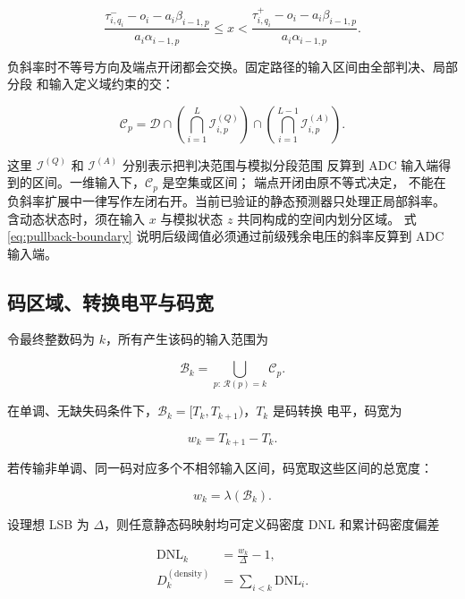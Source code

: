 \documentclass[11pt,a4paper]{ctexart}
\theoremstyle{adcplain}
\theoremstyle{definition}
\begin{document}
\begin{equation}
  \frac{\tau^-_{i,q_i}-o_i-a_i\beta_{i-1,p}}
       {a_i\alpha_{i-1,p}}
  \le x
  <
  \frac{\tau^+_{i,q_i}-o_i-a_i\beta_{i-1,p}}
       {a_i\alpha_{i-1,p}}.
  \label{eq:pullback-boundary}
\end{equation}

负斜率时不等号方向及端点开闭都会交换。固定路径的输入区间由全部判决、局部分段
和输入定义域约束的交：

\begin{equation}
  \mathcal C_p
  =
  \mathcal D
  \cap
  \left(\bigcap_{i=1}^{L}\mathcal I^{(Q)}_{i,p}\right)
  \cap
  \left(\bigcap_{i=1}^{L-1}\mathcal I^{(A)}_{i,p}\right).
  \label{eq:cell-intersection}
\end{equation}

这里 $\mathcal I^{(Q)}$ 和 $\mathcal I^{(A)}$ 分别表示把判决范围与模拟分段范围
反算到 ADC 输入端得到的区间。一维输入下，$\mathcal C_p$ 是空集或区间；
端点开闭由原不等式决定，
不能在负斜率扩展中一律写作左闭右开。当前已验证的静态预测器只处理正局部斜率。
含动态状态时，须在输入 $x$ 与模拟状态 $z$ 共同构成的空间内划分区域。
式 \eqref{eq:pullback-boundary} 说明后级阈值必须通过前级残余电压的斜率反算到
ADC 输入端。

\subsection{码区域、转换电平与码宽}

令最终整数码为 $k$，所有产生该码的输入范围为

\begin{equation}
  \mathcal B_k
  =
  \bigcup_{p:\,\mathcal R(p)=k}\mathcal C_p.
  \label{eq:code-preimage}
\end{equation}

在单调、无缺失码条件下，$\mathcal B_k=[T_k,T_{k+1})$，$T_k$ 是码转换
电平，码宽为

\begin{equation}
  w_k=T_{k+1}-T_k.
\end{equation}

若传输非单调、同一码对应多个不相邻输入区间，码宽取这些区间的总宽度：

\begin{equation}
  w_k=\lambda(\mathcal B_k).
  \label{eq:general-code-width}
\end{equation}

设理想 LSB 为 $\Delta$，则任意静态码映射均可定义码密度 DNL 和累计码密度偏差

\begin{align}
  \mathrm{DNL}_k
  &=\frac{w_k}{\Delta}-1, \label{eq:dnl}\\
  D_k^{(\mathrm{density})}
  &=\sum_{i<k}\mathrm{DNL}_i. \label{eq:density-cumulative}
\end{align}
\end{document}
